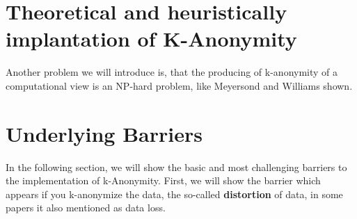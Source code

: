 \documentclass{llncs}
\begin{document}
\section{Theoretical and heuristically implantation of K-Anonymity}
Another problem we will introduce is, that the producing of k-anonymity of a computational view is an NP-hard problem, like Meyersond and Williams shown.
 
\section{Underlying Barriers}

In the following section, we will show the basic and most challenging barriers to the implementation of k-Anonymity. First, we will show the barrier which appears if you k-anonymize the data, the so-called \textbf{distortion} of data, in some papers it also mentioned as data loss. 
\end{document}
